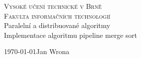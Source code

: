 
\begin{titlepage}
\begin{center}
\textsc{{\Huge Vysoké učení technické v Brně}\\
\medskip
{\huge Fakulta informačních technologií}}\\
{\LARGE Paralelní a distribuované algoritmy}\\
\medskip
{\Huge Implementace algoritmu pipeline merge sort}\\
\end{center}
{\Large \today \hfill Jan Wrona}
\end{titlepage}
